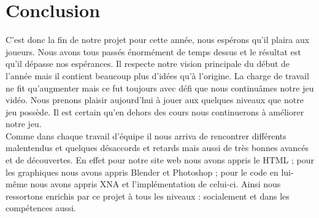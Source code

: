 \documentclass[12pt]{article}
\begin{document}
\section{Conclusion}

C’est donc la fin de notre projet pour cette année, nous espérons qu’il plaira aux joueurs. Nous avons tous passés énormément de temps dessus et le résultat est qu’il dépasse nos espérances. Il respecte notre vision principale du début de l’année mais il contient beaucoup plus d’idées qu’à l’origine. La charge de travail ne fit qu’augmenter mais ce fut toujours avec défi que nous continuâmes  notre jeu vidéo.  Nous prenons plaisir aujourd’hui à jouer aux quelques niveaux que notre jeu possède. Il est certain qu’en dehors des cours nous continuerons à améliorer notre jeu.\\

Comme dans chaque travail d’équipe il nous arriva de rencontrer différents malentendus et quelques désaccords et retards mais aussi de très bonnes avancés et de découvertes. En effet pour notre site web nous avons appris le HTML ; pour les graphiques nous avons appris Blender et Photoshop ; pour le code en lui-même nous avons appris XNA et l’implémentation de celui-ci. Ainsi nous ressortons enrichis par ce projet à tous les niveaux : socialement et dans les compétences aussi.\\
\end{document}
